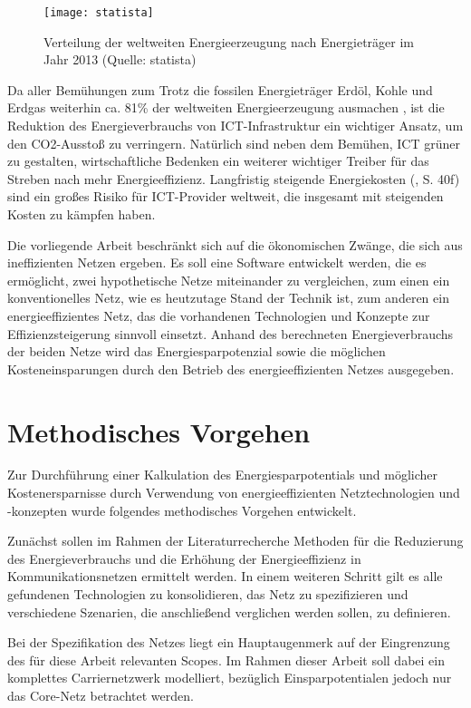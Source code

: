\begin{figure}[!ht]
    \centering
    \texttt{[image: statista]}
    \caption{Verteilung der weltweiten Energieerzeugung nach Energieträger im Jahr 2013 (Quelle: statista)}
    \label{fig:statista}
\end{figure}

Da aller Bemühungen zum Trotz die fossilen Energieträger Erdöl, Kohle und Erdgas weiterhin ca. 81\% der weltweiten Energieerzeugung ausmachen \cite{statista}, ist die Reduktion des Energieverbrauchs von ICT-Infrastruktur ein wichtiger Ansatz, um den CO2-Ausstoß zu verringern. Natürlich sind neben dem Bemühen, ICT grüner zu gestalten, wirtschaftliche Bedenken ein weiterer wichtiger Treiber für das Streben nach mehr Energieeffizienz. Langfristig steigende Energiekosten (\cite{iea2015}, S. 40f) sind ein großes Risiko für ICT-Provider weltweit, die insgesamt mit steigenden Kosten zu kämpfen haben.
 
Die vorliegende Arbeit beschränkt sich auf die ökonomischen Zwänge, die sich aus ineffizienten Netzen ergeben. Es soll eine Software entwickelt werden, die es ermöglicht, zwei hypothetische Netze miteinander zu vergleichen, zum einen ein konventionelles Netz, wie es heutzutage Stand der Technik ist, zum anderen ein energieeffizientes Netz, das die vorhandenen Technologien und Konzepte zur Effizienzsteigerung sinnvoll einsetzt. Anhand des berechneten Energieverbrauchs der beiden Netze wird das Energiesparpotenzial sowie die möglichen Kosteneinsparungen durch den Betrieb des energieeffizienten Netzes ausgegeben.


\section{Methodisches Vorgehen}
Zur Durchführung einer Kalkulation des Energiesparpotentials und möglicher Kostenersparnisse durch Verwendung von energieeffizienten Netztechnologien und -konzepten wurde folgendes methodisches Vorgehen entwickelt. 
 
Zunächst sollen im Rahmen der Literaturrecherche Methoden für die Reduzierung des Energieverbrauchs und die Erhöhung der Energieeffizienz in Kommunikationsnetzen ermittelt werden. In einem weiteren Schritt gilt es alle gefundenen Technologien zu konsolidieren, das Netz zu spezifizieren und verschiedene Szenarien, die anschließend verglichen werden sollen, zu definieren. 
 
Bei der Spezifikation des Netzes liegt ein Hauptaugenmerk auf der Eingrenzung des für diese Arbeit relevanten Scopes. Im Rahmen dieser Arbeit soll dabei ein komplettes Carriernetzwerk modelliert, bezüglich Einsparpotentialen jedoch nur das Core-Netz betrachtet werden.
 
